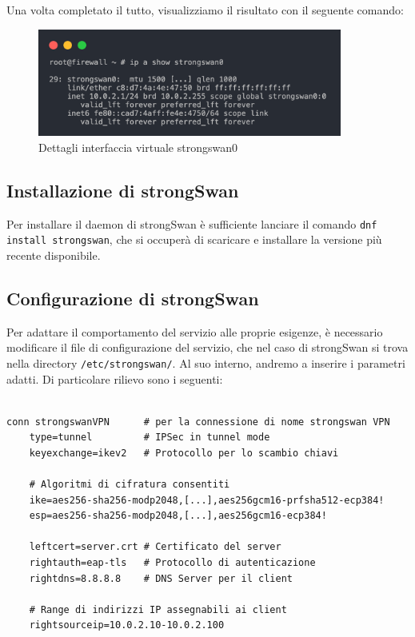 Una volta completato il tutto, visualizziamo il risultato con il seguente comando:
\begin{figure}[ht]
    \centering
    \includegraphics[width=10cm]{figure/show_sw0.png}
    \caption{Dettagli interfaccia virtuale strongswan0}
\end{figure}

\subsection{Installazione di strongSwan}
Per installare il daemon di strongSwan è sufficiente lanciare il comando \texttt{dnf install strongswan}, che si occuperà di scaricare e installare la versione più recente disponibile.

\subsection{Configurazione di strongSwan}
Per adattare il comportamento del servizio alle proprie esigenze, è necessario modificare il file di configurazione del servizio, che nel caso di strongSwan si trova nella directory \texttt{/etc/strongswan/}.
Al suo interno, andremo a inserire i parametri adatti. Di particolare rilievo sono i seguenti:

\begin{verbatim}

conn strongswanVPN      # per la connessione di nome strongswan VPN
    type=tunnel         # IPSec in tunnel mode
    keyexchange=ikev2   # Protocollo per lo scambio chiavi

    # Algoritmi di cifratura consentiti
    ike=aes256-sha256-modp2048,[...],aes256gcm16-prfsha512-ecp384!
    esp=aes256-sha256-modp2048,[...],aes256gcm16-ecp384!
    
    leftcert=server.crt # Certificato del server
    rightauth=eap-tls   # Protocollo di autenticazione
    rightdns=8.8.8.8    # DNS Server per il client

    # Range di indirizzi IP assegnabili ai client
    rightsourceip=10.0.2.10-10.0.2.100
\end{verbatim}

